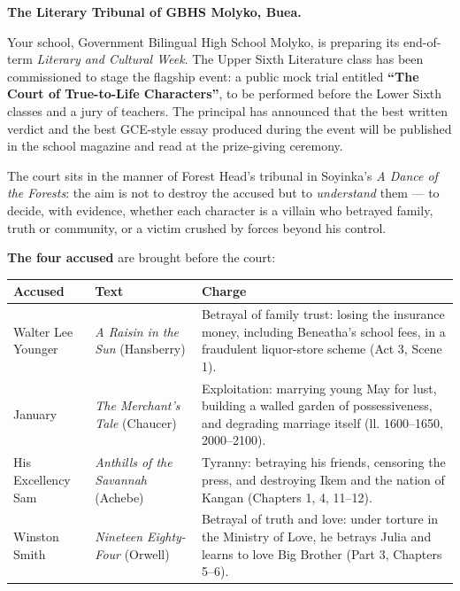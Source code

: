 \documentclass[11pt]{article}
\newcounter{popsec}
\newcounter{popsub}
\newcommand{\courssub}[1]{%
  \stepcounter{popsub}%
  \par\vspace{9pt}\noindent{\popxbold\fontsize{11.5}{13}\selectfont\color{popink}{\color{poporange}\thepopsec.\thepopsub}\hspace{6pt}#1}\par\nopagebreak\vspace{4pt}
}
\begin{document}
\courssub{Situation}

\textbf{The Literary Tribunal of GBHS Molyko, Buea.}\par
\medskip
Your school, Government Bilingual High School Molyko, is preparing its end-of-term \emph{Literary and Cultural Week}. The Upper Sixth Literature class has been commissioned to stage the flagship event: a public mock trial entitled \textbf{``The Court of True-to-Life Characters''}, to be performed before the Lower Sixth classes and a jury of teachers. The principal has announced that the best written verdict and the best GCE-style essay produced during the event will be published in the school magazine and read at the prize-giving ceremony.

The court sits in the manner of Forest Head's tribunal in Soyinka's \emph{A Dance of the Forests}: the aim is not to destroy the accused but to \emph{understand} them — to decide, with evidence, whether each character is a villain who betrayed family, truth or community, or a victim crushed by forces beyond his control.

\textbf{The four accused} are brought before the court:

\begin{center}
\begin{tabularx}{\linewidth}{|l|X|X|}
\hline
\rowcolor{popblueL} \textbf{Accused} & \textbf{Text} & \textbf{Charge} \\
\hline
Walter Lee Younger & \emph{A Raisin in the Sun} (Hansberry) & Betrayal of family trust: losing the insurance money, including Beneatha's school fees, in a fraudulent liquor-store scheme (Act 3, Scene 1). \\
\hline
January & \emph{The Merchant's Tale} (Chaucer) & Exploitation: marrying young May for lust, building a walled garden of possessiveness, and degrading marriage itself (ll. 1600--1650, 2000--2100). \\
\hline
His Excellency Sam & \emph{Anthills of the Savannah} (Achebe) & Tyranny: betraying his friends, censoring the press, and destroying Ikem and the nation of Kangan (Chapters 1, 4, 11--12). \\
\hline
Winston Smith & \emph{Nineteen Eighty-Four} (Orwell) & Betrayal of truth and love: under torture in the Ministry of Love, he betrays Julia and learns to love Big Brother (Part 3, Chapters 5--6). \\
\hline
\end{tabularx}
\end{center}
\end{document}
